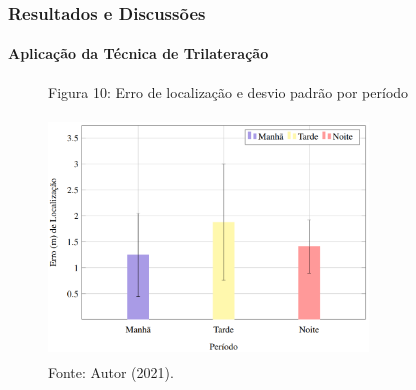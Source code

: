 \documentclass[xcolor={dvipsnames,svgnames,table}]{beamer}
\begin{document}

	
	\begin{frame}
		\frametitle{Resultados e Discussões}
		\framesubtitle{Aplicação da Técnica de Trilateração}
		\begin{figure}
			\caption*{Figura 10: Erro de localização e desvio padrão por período}
			\vspace{-5pt}
			\centering
			\includegraphics[width=8.5cm, height=6.4cm]{imgs/grafico_final.PNG}
			\vspace{-5pt}
			\caption*{\tiny{Fonte: Autor (2021).}}
		\end{figure}
	\end{frame}
	
\end{document}
